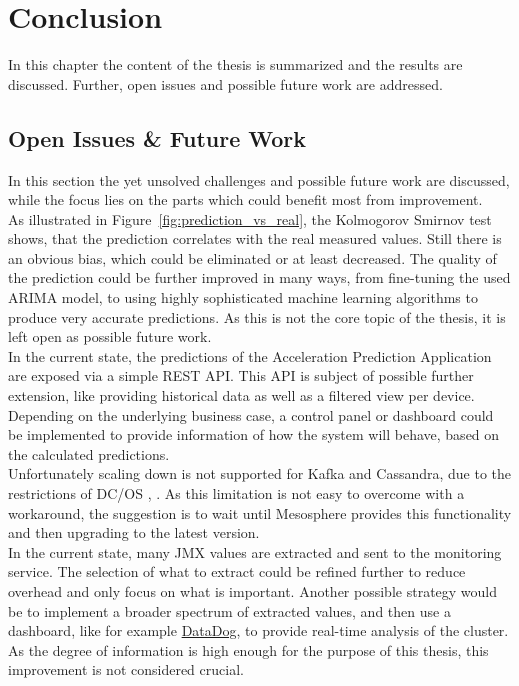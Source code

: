 \chapter{Conclusion}
\label{ch:conclusion}
In this chapter the content of the thesis is summarized and the results are discussed.
Further, open issues and possible future work are addressed.


\section{Open Issues \& Future Work}
In this section the yet unsolved challenges and possible future work are discussed, while the focus lies on the parts which could benefit most from improvement.\\

As illustrated in Figure~\ref{fig:prediction_vs_real}, the Kolmogorov Smirnov test shows, that the prediction correlates with the real measured values.
Still there is an obvious bias, which could be eliminated or at least decreased.
The quality of the prediction could be further improved in many ways, from fine-tuning the used ARIMA model, to using highly sophisticated machine learning algorithms to produce very accurate predictions.
As this is not the core topic of the thesis, it is left open as possible future work.\\
In the current state, the predictions of the Acceleration Prediction Application are exposed via a simple REST API.
This API is subject of possible further extension, like providing historical data as well as a filtered view per device.
Depending on the underlying business case, a control panel or dashboard could be implemented to provide information of how the system will behave, based on the calculated predictions.\\

Unfortunately scaling down is not supported for Kafka and Cassandra, due to the restrictions of DC/OS \cite{mesosphere}, \cite{cassandra_limitations}.
As this limitation is not easy to overcome with a workaround, the suggestion is to wait until Mesosphere provides this functionality and then upgrading to the latest version.\\

In the current state, many JMX values are extracted and sent to the monitoring service.
The selection of what to extract could be refined further to reduce overhead and only focus on what is important.
Another possible strategy would be to implement a broader spectrum of extracted values, and then use a dashboard, like for example \href{https://www.datadoghq.com/}{DataDog}, to provide real-time analysis of the cluster.
As the degree of information is high enough for the purpose of this thesis, this improvement is not considered crucial.\\

